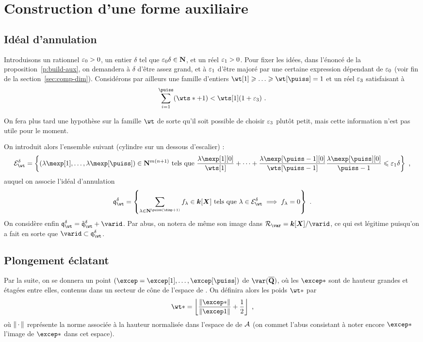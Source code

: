 
\section{Construction d'une forme auxiliaire} \label{sec:siegel}

\subsection{Idéal d'annulation}

Introduisons un rationnel ${\varepsilon_0} > 0$, un entier $\delta$ tel que
${\varepsilon_0}\delta \in {\mathbf{N}}$, et un réel ${\varepsilon_1} > 0$. Pour fixer les idées, dans
l'énoncé de la proposition~\ref{p:build-aux}, on demandera à $\delta$ d'être
assez grand, et à ${\varepsilon_1}$ d'être majoré par une certaine expression dépendant
de ${\varepsilon_0}$ (voir fin de la section~\ref{sec:comp-dim}). Considérons par
ailleurs une famille d'entiers $\wt[1] \ge \dots \ge \wt[\puiss] = 1$ et un
réel ${\varepsilon_3}$ satisfaisant à
\[
  \sum_{\fct=1}^\puiss (\wts* + 1) < \wts[1] (1 + \epsiii)
  \pmm.
\]

On fera plus tard une hypothèse sur la famille $\wt$ de sorte qu'il soit
possible de choisir ${\varepsilon_3}$ plutôt petit, mais cette information n'est pas
utile pour le moment.

On introduit alors l'ensemble suivant (cylindre sur un dessous d'escalier) :
\[
  \stairs = \left\{
    (\coeff[1], \dots, \coeff[\puiss]) \in \N^{m(n+1)}
    \text{ tels que }
    \frac {\coeff[1][0]} {\wts[1]}
    + \dots +
    \frac {\coeff[\puiss-1][0]} {\wts[\puiss-1]}
    \frac {\coeff[\puiss][0]} {\puiss-1}
    \le \epsi \delta
    \right\}
  \pmm,
\]
auquel on associe l'idéal d'annulation
\[
  \vanish = \left\{
    \sum_{\lambda \in \N^{\puiss(\dimp+1)}} f_\lambda
    \in \cdn [\cmmh]
    \text{ tels que }
    \lambda \in \stairs
    \implies
    f_\lambda = 0
    \right\}
  \pmm.
\]
On considère enfin $\vanish = \vanish* + \varid$. Par abus,
on notera de même son image dans $\ring\var = \cdn [\cmmh] / \varid$, ce qui
est légitime puisqu'on a fait en sorte que $\varid \subset \vanish$.

\subsection{Plongement éclatant}

Par la suite, on se donnera un point
$(\excep = \excep[1], \dots, \excep[\puiss])$
de $\var(\Qbar)$, où les $\excep*$ sont de hauteur grandes et étagées entre
elles, contenus dans un secteur de cône de l'espace de . On
définira alors les poids $\wt*$ par
\begin{equation}
  \wt* =
  \left\lfloor
  \frac {\norm{\excep*}} {\norm{\excep1}}
  + \frac12
  \right\rfloor
  \pmm,
\end{equation}
où $\lVert{\,\cdot\,}\rVert$ représente la norme associée à la hauteur normalisée dans
l'espace de  de $\mathcal A$ (on commet l'abus consistant à noter
encore $\excep*$ l'image de $\excep*$ dans cet espace).

